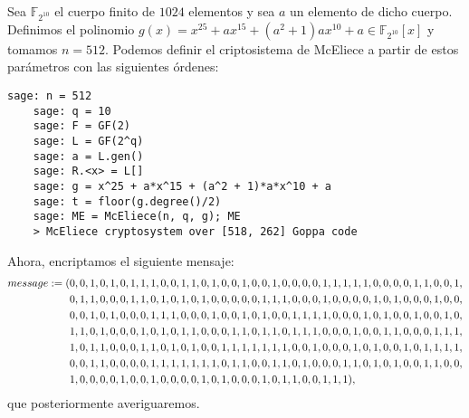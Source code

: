 \begin{exampleth}
    Sea $\mathbb{F}_{2^{10}}$ el cuerpo finito de $1024$ elementos y sea $a$ un elemento de dicho cuerpo. Definimos el polinomio $g(x) = x^{25} + ax^{15} + (a^2 + 1)ax^{10} + a \in \mathbb{F}_{2^{10}}[x]$ y tomamos $n = 512$. Podemos definir el criptosistema de McEliece a partir de estos parámetros con las siguientes órdenes:

    \begin{lstlisting}[gobble=4]
    sage: n = 512
    sage: q = 10
    sage: F = GF(2)
    sage: L = GF(2^q)
    sage: a = L.gen()
    sage: R.<x> = L[]
    sage: g = x^25 + a*x^15 + (a^2 + 1)*a*x^10 + a
    sage: t = floor(g.degree()/2)
    sage: ME = McEliece(n, q, g); ME
    > McEliece cryptosystem over [518, 262] Goppa code
    \end{lstlisting}

    Ahora, encriptamos el siguiente mensaje:
    \begin{align}
        message := (&0, 0, 1, 0, 1, 0, 1, 1, 1, 0, 0, 1, 1, 0, 1, 0, 0, 1, 0, 0, 1, 0, 0, 0, 0, 1, 1, 1, 1, 1, 0, 0, 0, 0, 1, 1, 0, 0, 1, \notag\\ 
                    & 0, 1, 1, 0, 0, 0, 1, 1, 0, 1, 0, 1, 0, 1, 0, 0, 0, 0, 0, 1, 1, 1, 0, 0, 0, 1, 0, 0, 0, 0, 1, 0, 1, 0, 0, 0, 1, 0, 0, \notag\\
                    & 0, 0, 1, 0, 1, 0, 0, 0, 1, 1, 1, 0, 0, 0, 1, 0, 0, 1, 0, 1, 0, 0, 1, 1, 1, 1, 0, 0, 0, 1, 0, 1, 0, 0, 1, 0, 0, 1, 0, \notag\\
                    & 1, 1, 0, 1, 0, 0, 0, 1, 0, 1, 0, 1, 1, 0, 0, 0, 1, 1, 0, 1, 1, 0, 1, 1, 1, 0, 0, 0, 1, 0, 0, 1, 1, 0, 0, 0, 1, 1, 1, \notag\\
                    & 1, 0, 1, 1, 0, 0, 0, 1, 1, 0, 1, 0, 1, 0, 0, 1, 1, 1, 1, 1, 1, 1, 0, 0, 1, 0, 0, 0, 1, 0, 1, 0, 0, 1, 0, 1, 1, 1, 1, \notag\\
                    & 0, 0, 1, 1, 0, 0, 0, 0, 1, 1, 1, 1, 1, 1, 1, 0, 1, 1, 0, 0, 1, 1, 0, 1, 0, 0, 0, 1, 1, 0, 1, 0, 1, 0, 0, 1, 1, 0, 0, \notag\\
                    & 1, 0, 0, 0, 0, 1, 0, 0, 1, 0, 0, 0, 0, 1, 0, 1, 0, 0, 0, 1, 0, 1, 1, 0, 0, 1, 1, 1), \label{message}
    \end{align}
    que posteriormente averiguaremos.


\end{exampleth}
